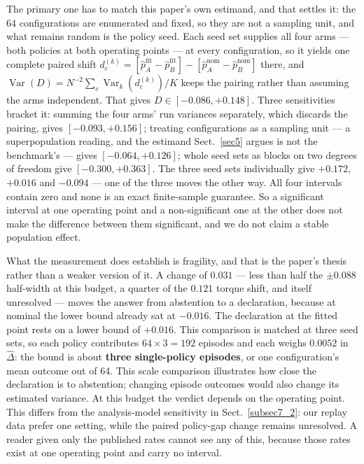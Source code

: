 \documentclass[pdflatex,iicol,sn-apa]{sn-jnl}
\theoremstyle{remark}
\begin{document}
The primary one has to match this paper's own estimand, and that settles it: the 64 configurations
are enumerated and fixed, so they are not a sampling unit, and what remains random is the policy
seed. Each seed set supplies all four arms --- both policies at both operating points --- at every
configuration, so it yields one complete paired shift
$d_c^{(k)} = [\hat p_A^{\mathrm{fit}} - \hat p_B^{\mathrm{fit}}] - [\hat p_A^{\mathrm{nom}} - \hat p_B^{\mathrm{nom}}]$
there, and $\operatorname{Var}(D) = N^{-2}\sum_c \operatorname{Var}_k(d_c^{(k)})/K$ keeps the pairing
rather than assuming the arms independent. That gives
$D \in \mathbf{[-0.086, +0.148]}$. Three sensitivities bracket it: summing the four arms' run
variances separately, which discards the pairing, gives $[-0.093, +0.156]$; treating configurations
as a sampling unit --- a superpopulation reading, and the estimand
Sect.~\ref{sec5} argues is not the benchmark's --- gives $[-0.064, +0.126]$; whole seed sets as
blocks on two degrees of freedom
give $[-0.300, +0.363]$. The three seed sets individually give $+0.172$, $+0.016$ and
$\mathbf{-0.094}$ --- one of the three moves the other way. All four intervals contain zero and none
is an exact finite-sample guarantee. So a significant interval at one operating point and a
non-significant one at the other does not make the difference between them significant, and we do
not claim a stable population effect.

What the measurement does establish is fragility, and that is the paper's thesis rather than a
weaker version of it. A change of $0.031$ --- less than half the $\pm 0.088$ half-width at this
budget, a quarter of the $0.121$ torque shift, and itself unresolved --- moves the answer from
abstention to a declaration, because at nominal the lower bound already sat at $-0.016$. The
declaration at the fitted point rests on a lower bound of $+0.016$. This comparison is matched at
three seed sets, so each policy contributes $64 \times 3 = 192$ episodes and each weighs $0.0052$ in
$\hat\Delta$: the bound is about \textbf{three single-policy episodes}, or one configuration's mean
outcome out of 64. This scale comparison illustrates how close the declaration is to abstention;
changing episode outcomes would also change its estimated variance. At this budget the verdict
depends on the operating point. This differs from the analysis-model sensitivity in
Sect.~\ref{subsec7_2}: our replay data prefer one setting, while the paired policy-gap change
remains unresolved. A reader given only the published rates
cannot see any of this, because those rates exist at one operating point and carry no interval.
\end{document}
